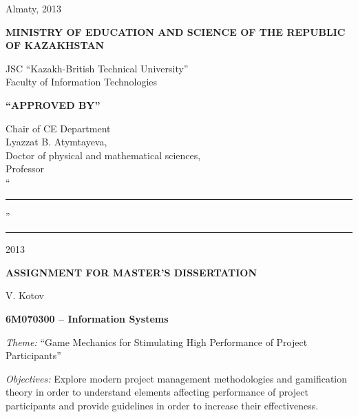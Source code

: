 \begin{titlepage}
\begin{center}
    \end{center}


    \begin{center}
        \vfill
        Almaty, 2013
    \end{center}

    \pagebreak


    \begin{center}
    {\bf{\MakeUppercase{Ministry of education and science of the republic of Kazakhstan}}

        \vspace{14pt}

        JSC ``Kazakh-British Technical University''\\
        Faculty of Information Technologies}

        \vspace{14pt}
        
        \begin{flushright}
            {\bf \MakeUppercase{``Approved by''}}

            Chair of CE Department\\
            Lyazzat B. Atymtayeva,\\
            Doctor of physical and mathematical sciences,\\
            Professor\\

            \vspace{0.5\baselineskip}
            ``\rule{2em}{0.4pt}'' \rule{8em}{0.4pt} 2013\\
            \end{flushright}
        
        {\bf
        \MakeUppercase{Assignment for master's dissertation}}

    \end{center}

    \setlength{\parindent}{0pt}
    \setlength{\parskip}{1ex plus 0.5ex minus 0.2ex}

    V. Kotov

    {\bf 6M070300 -- Information Systems}

    \emph{Theme:} ``Game Mechanics for Stimulating High Performance of Project Participants''
    
   \emph{Objectives:}
    Explore modern project management methodologies and gamification theory in order to understand elements affecting performance of project participants and provide guidelines in order to increase their effectiveness.
    

\end{titlepage}
